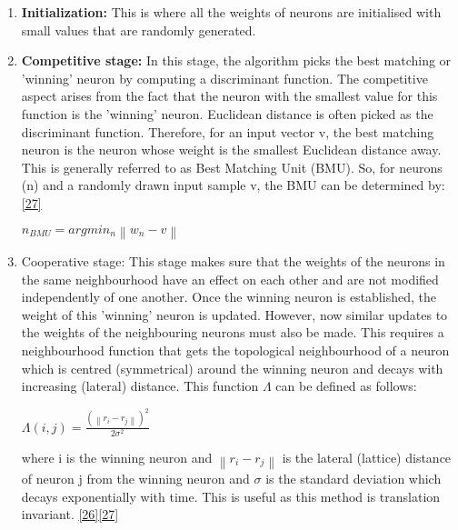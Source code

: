 \begin{enumerate}
    \item \textbf{Initialization: }
    This is where all the weights of neurons are initialised with small values that are randomly generated. 
    
    \item \textbf{Competitive stage: }
    In this stage, the algorithm picks the best matching or 'winning' neuron by computing a discriminant function. The competitive aspect arises from the fact that the neuron with the smallest value for this function is the 'winning' neuron. Euclidean distance is often picked as the discriminant function. Therefore, for an input vector v, the best matching neuron is the neuron whose weight is the smallest Euclidean distance away. This is generally referred to as Best Matching Unit (BMU). So, for neurons (n) and a randomly drawn input sample v, the BMU can be determined by: \hyperlink{27}{[27]}

    \begin{center}
         $ n_{BMU} = argmin_{n} \left\lVert w_{n} - v \right\rVert $
    \end{center}


\item Cooperative stage: 
    This stage makes sure that the weights of the neurons in the same neighbourhood have an effect on each other and are not modified independently of one another. Once the winning neuron is established, the weight of this 'winning' neuron is updated. However, now similar updates to the weights of the neighbouring neurons must also be made. This requires a neighbourhood function that gets the topological neighbourhood of a neuron which is centred (symmetrical) around the winning neuron and decays with increasing (lateral) distance. This function $\Lambda$ can be defined as follows: 
    \begin{center}
    
        $\Lambda(i, j) = \frac{( \left\lVert r_{i} - r_{j} \right\rVert)^2}{2\sigma^2} $
        
         \end{center}
         
        where  i is the winning neuron and $\left\lVert r_{i} - r_{j} \right\rVert$ is the  lateral (lattice) distance of neuron j from the winning neuron and $\sigma$ is the standard deviation which decays exponentially with time. This is useful as this method is translation invariant. \hyperlink{26}{[26]}\hyperlink{27}{[27]}
        

\end{enumerate}
